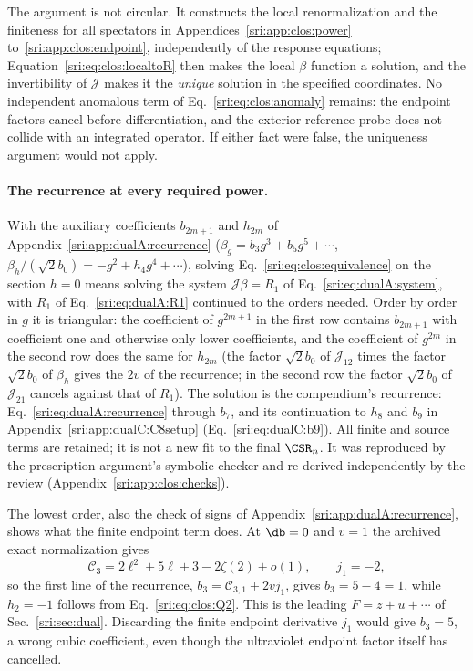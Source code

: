 The argument is not circular. It constructs the local renormalization and the finiteness for all spectators in
Appendices~\ref{sri:app:clos:power} to~\ref{sri:app:clos:endpoint}, independently of the response equations;
Equation~\eqref{sri:eq:clos:localtoR} then makes the local $\beta$ function a solution, and the invertibility of
$\mathcal J$ makes it the \emph{unique} solution in the specified coordinates. No
independent anomalous term of Eq.~\eqref{sri:eq:clos:anomaly} remains: the endpoint factors cancel before
differentiation, and the exterior reference probe does not collide with an integrated operator. If either fact were
false, the uniqueness argument would not apply.

\paragraph{The recurrence at every required power.} With the auxiliary coefficients $b_{2m+1}$ and $h_{2m}$ of
Appendix~\ref{sri:app:dualA:recurrence} ($\beta_g=b_3g^3+b_5g^5+\cdots$, $\beta_h/(\sqrt2b_0)=-g^2+h_4g^4+\cdots$),
solving Eq.~\eqref{sri:eq:clos:equivalence} on the section $h=0$ means solving the system $\mathcal J\beta=R_1$ of
Eq.~\eqref{sri:eq:dualA:system}, with $R_1$ of Eq.~\eqref{sri:eq:dualA:R1} continued to the orders needed. Order by order in
$g$ it is triangular: the coefficient of $g^{2m+1}$ in the first
row contains $b_{2m+1}$ with coefficient one and otherwise only lower coefficients, and the coefficient of $g^{2m}$ in
the second row does the same for $h_{2m}$ (the factor $\sqrt2b_0$ of $\mathcal J_{12}$ times the factor $\sqrt2b_0$ of $\beta_h$ gives the $2v$ of the
recurrence; in the second row the factor $\sqrt2b_0$ of $\mathcal J_{21}$ cancels against that of $R_1$). The solution is the compendium's recurrence: Eq.~\eqref{sri:eq:dualA:recurrence} through $b_7$, and its continuation to
$h_8$ and $b_9$ in Appendix~\ref{sri:app:dualC:C8setup} (Eq.~\eqref{sri:eq:dualC:b9}). All finite and source terms are
retained; it is not a new fit to the final $\CSR_n$. It was reproduced by the prescription
argument's symbolic checker and re-derived independently by the review (Appendix~\ref{sri:app:clos:checks}).

The lowest order, also the check of signs of Appendix~\ref{sri:app:dualA:recurrence}, shows what the finite endpoint
term does. At $\db=0$ and $v=1$ the archived exact normalization gives
\begin{equation}
 \mathcal C_3=2\ell^2+5\ell+3-2\zeta(2)+o(1),\qquad j_1=-2,
\end{equation}
so the first line of the recurrence, $b_3=\mathcal C_{3,1}+2vj_1$, gives $b_3=5-4=1$, while $h_2=-1$ follows from
Eq.~\eqref{sri:eq:clos:Q2}. This is the leading $F=z+u+\cdots$ of Sec.~\ref{sri:sec:dual}. Discarding the finite endpoint
derivative $j_1$ would give $b_3=5$, a wrong cubic coefficient, even though the ultraviolet endpoint factor itself has
cancelled.

